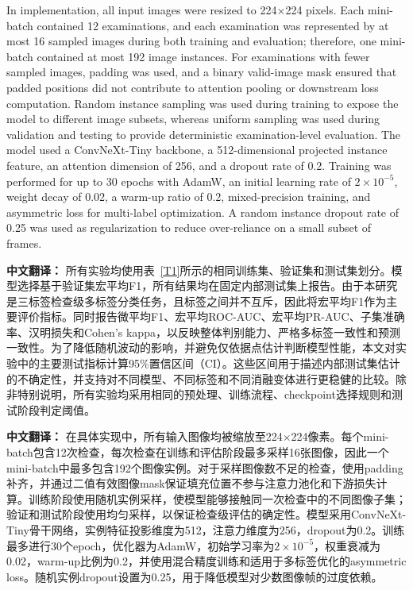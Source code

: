 \documentclass[Afour,sagev,times]{sagej}
\begin{document}
In implementation, all input images were resized to 224$\times$224 pixels. Each mini-batch contained 12 examinations, and each examination was represented by at most 16 sampled images during both training and evaluation; therefore, one mini-batch contained at most 192 image instances. For examinations with fewer sampled images, padding was used, and a binary valid-image mask ensured that padded positions did not contribute to attention pooling or downstream loss computation. Random instance sampling was used during training to expose the model to different image subsets, whereas uniform sampling was used during validation and testing to provide deterministic examination-level evaluation. The model used a ConvNeXt-Tiny backbone, a 512-dimensional projected instance feature, an attention dimension of 256, and a dropout rate of 0.2. Training was performed for up to 30 epochs with AdamW,\cite{R19} an initial learning rate of $2\times10^{-5}$, weight decay of 0.02, a warm-up ratio of 0.2, mixed-precision training, and asymmetric loss for multi-label optimization.\cite{R20} A random instance dropout rate of 0.25 was used as regularization to reduce over-reliance on a small subset of frames.

\textbf{中文翻译：} 所有实验均使用表~\ref{T1}所示的相同训练集、验证集和测试集划分。模型选择基于验证集宏平均F1，所有结果均在固定内部测试集上报告。由于本研究是三标签检查级多标签分类任务，且标签之间并不互斥，因此将宏平均F1作为主要评价指标。同时报告微平均F1、宏平均ROC-AUC、宏平均PR-AUC、子集准确率、汉明损失和Cohen's kappa，以反映整体判别能力、严格多标签一致性和预测一致性。为了降低随机波动的影响，并避免仅依据点估计判断模型性能，本文对实验中的主要测试指标计算95\%置信区间（CI）。这些区间用于描述内部测试集估计的不确定性，并支持对不同模型、不同标签和不同消融变体进行更稳健的比较。除非特别说明，所有实验均采用相同的预处理、训练流程、checkpoint选择规则和测试阶段判定阈值。

\textbf{中文翻译：} 在具体实现中，所有输入图像均被缩放至224$\times$224像素。每个mini-batch包含12次检查，每次检查在训练和评估阶段最多采样16张图像，因此一个mini-batch中最多包含192个图像实例。对于采样图像数不足的检查，使用padding补齐，并通过二值有效图像mask保证填充位置不参与注意力池化和下游损失计算。训练阶段使用随机实例采样，使模型能够接触同一次检查中的不同图像子集；验证和测试阶段使用均匀采样，以保证检查级评估的确定性。模型采用ConvNeXt-Tiny骨干网络，实例特征投影维度为512，注意力维度为256，dropout为0.2。训练最多进行30个epoch，优化器为AdamW，初始学习率为$2\times10^{-5}$，权重衰减为0.02，warm-up比例为0.2，并使用混合精度训练和适用于多标签优化的asymmetric loss。随机实例dropout设置为0.25，用于降低模型对少数图像帧的过度依赖。
\end{document}

